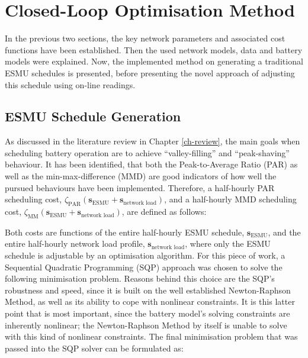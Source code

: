 \section{Closed-Loop Optimisation Method}
\label{ch1:sec:closed-loop-optimisation-method}

In the previous two sections, the key network parameters and associated cost functions have been established.
Then the used network models, data and battery models were explained.
Now, the implemented method on generating a traditional ESMU schedules is presented, before presenting the novel approach of adjusting this schedule using on-line readings.

\subsection{ESMU Schedule Generation}
\label{ch1:subsec:esmu-schedule-generation}

As discussed in the literature review in Chapter \ref{ch-review}, the main goals when scheduling battery operation are to achieve ``valley-filling'' and ``peak-shaving'' behaviour.
It has been identified, that both the Peak-to-Average Ratio (PAR) as well as the min-max-difference (MMD) are good indicators of how well the pursued behaviours have been implemented.
Therefore, a half-hourly PAR scheduling cost, $\zeta_\text{PAR}(\textbf{s}_\text{ESMU} + \textbf{s}_\text{network load})$, and a half-hourly MMD scheduling cost, $\zeta_\text{MM}(\textbf{s}_\text{ESMU} + \textbf{s}_\text{network load})$, are defined as follows:






Both costs are functions of the entire half-hourly ESMU schedule, $\textbf{s}_\text{ESMU}$, and the entire half-hourly network load profile, $\textbf{s}_\text{network load}$, where only the ESMU schedule is adjustable by an optimisation algorithm.
For this piece of work, a Sequential Quadratic Programming (SQP) approach was chosen to solve the following minimisation problem.
Reasons behind this choice are the SQP's robustness and speed, since it is built on the well established Newton-Raphson Method, as well as its ability to cope with nonlinear constraints.
It is this latter point that is most important, since the battery model's solving constraints are inherently nonlinear; the Newton-Raphson Method by itself is unable to solve with this kind of nonlinear constraints.
The final minimisation problem that was passed into the SQP solver can be formulated as:

